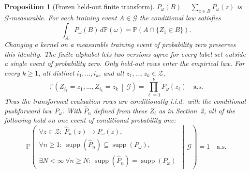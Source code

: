 \documentclass[11pt]{article}
\newtheorem{proposition}[theorem]{Proposition}
\theoremstyle{definition}
\newcommand{\cZ}{\mathcal{Z}}
\newcommand{\Phat}{\widehat{P}}
\newcommand{\Prb}{\mathbb{P}}
\newcommand{\supp}{\operatorname{supp}}
\begin{document}
\begin{proposition}[Frozen held-out finite transform]
$P_\omega(B)=\sum_{z\in B}P_\omega(z)$ is $\mathcal G$-measurable. For each training event
$A\in\mathcal G$ the conditional law satisfies~\cite{kallenberg2021}
\[
  \int_A P_\omega(B)\,d\Prb(\omega)=\Prb(A\cap\{Z_1\in B\}).
\]
Changing a kernel on a measurable training event of probability zero preserves this identity.
The finite alphabet lets two versions agree for every label set outside a single event of
probability zero. Only held-out rows enter the empirical law. For every
$k\ge1$, all distinct $i_1,\ldots,i_k$, and all $z_1,\ldots,z_k\in\cZ$,
\begin{equation}\label{eq:frozen-conditional-iid}
  \Prb\!\left(
    Z_{i_1}=z_1,\ldots,Z_{i_k}=z_k
    \,\middle|\,\mathcal G
  \right)
  =
  \prod_{\ell=1}^{k}P_\omega(z_\ell)
  \quad\text{a.s.}
\end{equation}
Thus the transformed evaluation rows are conditionally i.i.d.\ with the conditional pushforward
law $P_\omega$.  With $\Phat_n$ defined from these $Z_i$ as in Section~2, all of the following
hold on one event of conditional probability one:
\begin{equation}\label{eq:frozen-simultaneous}
  \Prb\!\left(
    \begin{gathered}
      \forall z\in\cZ:\ \Phat_n(z)\longrightarrow P_\omega(z),\\
      \forall n\ge1:\ \supp(\Phat_n)\subseteq\supp(P_\omega),\\
      \exists N<\infty\ \forall n\ge N:\
        \supp(\Phat_n)=\supp(P_\omega)
    \end{gathered}
    \,\middle|\,\mathcal G
  \right)
  =1
  \quad\text{a.s.}
\end{equation}
\end{proposition}
\end{document}

